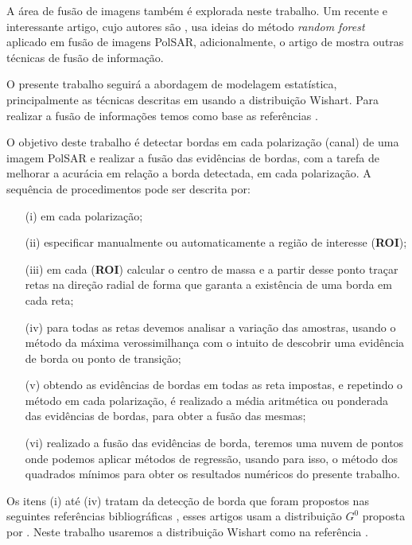 A área de fusão de imagens também é explorada neste trabalho. 
Um recente e interessante artigo, cujo autores são \citet{sglmla}, usa ideias do método \textit{random forest} aplicado em fusão de imagens PolSAR, adicionalmente, o artigo de \citet{sg} mostra outras técnicas de fusão de informação.  

O presente trabalho seguirá a abordagem de modelagem estatística, principalmente as técnicas descritas em \citep{fbgm, nhfc} usando a distribuição Wishart. Para realizar a fusão de informações temos como base as referências \citep{mit, sglmla, sg}. 

O objetivo deste trabalho é detectar bordas em cada polarização (canal) de uma imagem PolSAR e realizar a fusão das evidências de bordas, com a tarefa de melhorar a acurácia em relação a borda detectada, em cada polarização. A sequência de procedimentos pode ser descrita por:
\begin{itemize}%
	\item[(i)] em cada polarização;
	\item[(ii)] especificar manualmente ou automaticamente a região de interesse (\textbf{ROI});
	\item[(iii)] em cada (\textbf{ROI}) calcular o centro de massa e a partir desse ponto traçar retas na direção radial de forma que garanta a existência de uma borda em cada reta;
	\item[(iv)] para todas as retas devemos analisar a variação das amostras, usando o método da máxima verossimilhança com o intuito de descobrir uma evidência de borda ou ponto de transição;
	\item[(v)] obtendo as evidências de bordas em todas as reta impostas, e repetindo o método em cada polarização, é realizado a média aritmética ou ponderada das evidências de bordas, para obter a fusão das mesmas;
	\item[(vi)] realizado a fusão das evidências de borda, teremos uma nuvem de pontos onde podemos aplicar métodos de regressão, usando para isso, o método dos quadrados mínimos para obter os resultados numéricos do presente trabalho.
\end{itemize}

Os itens (i) até (iv) tratam da detecção de borda que foram propostos nas seguintes referências bibliográficas \citep{gmbf, gmbf_sc, fbgm}, esses artigos usam a distribuição $G^{0}$ proposta por \citet{fmcs}. Neste trabalho usaremos a distribuição Wishart como na referência \citep{nhfc}. 

